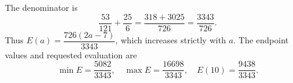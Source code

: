 The denominator is
\[
\dfrac{53}{121}+\dfrac{25}{6}=\dfrac{318+3025}{726}=\dfrac{3343}{726}.
\]
Thus $E(a)=\dfrac{726(2a-7)}{3343}$, which increases strictly with $a$. The endpoint values and requested evaluation are
\[
\boxed{\min E=\dfrac{5082}{3343},\quad
\max E=\dfrac{16698}{3343},\quad E(10)=\dfrac{9438}{3343}}.
\]
